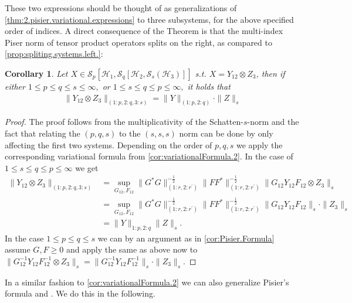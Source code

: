 \documentclass[11pt]{article}
\newcommand{\1}{\ensuremath{\mathbbm{1}}}
\theoremstyle{newdefinition}
\theoremstyle{newplain}
\newtheorem{corollary}[definition]{Corollary}
\theoremstyle{myplain}
\begin{document}
These two expressions should be thought of as generalizations of \cref{thm:2.pisier.variational.expressions} to three subsystems, for the above specified order of indices.
A direct consequence of the Theorem is that the multi-index Piser norm of tensor product operators splits on the right, as compared to \cref{prop:spliting.systems.left.}:
\begin{corollary}
Let $X\in\mathcal{S}_{p}[\mathcal{H}_1,\mathcal{S}_q[\mathcal{H}_2,\mathcal{S}_s(\mathcal{H}_3)]]$ s.t. $X=Y_{12}\otimes Z_3$, then if either $1\leq p\leq q\leq s\leq \infty,$ or $1\leq s\leq q\leq p\leq \infty,$ it holds that
\begin{align}
    \|Y_{12}\otimes Z_3\|_{(1:p,2:q,3:s)} = \|Y\|_{(1:p,2:q)}\cdot\|Z\|_s
\end{align}
\end{corollary}
\begin{proof}
The proof follows from the multiplicativity of the Schatten-$s$-norm and the fact that relating the $(p,q,s)$ to the $(s,s,s)$ norm can be done by only affecting the first two systems. 
Depending on the order of $p,q,s$ we apply the corresponding variational formula from \cref{cor:variationalFormula.2}. In the case of $1\leq s\leq q\leq p\leq \infty$ we get
\begin{align}
   \|Y_{12}\otimes Z_3\|_{(1:p,2:q,3:s)} &= \sup_{G_{12},F_{12}}\|G^*G\|^{-\frac{1}{2}}_{(1:r,2:r^\prime)}\|FF^*\|^{-\frac{1}{2}}_{(1:r,2:r^\prime)}\|G_{12}Y_{12}F_{12}\otimes Z_3\|_s \\&= \sup_{G_{12},F_{12}}\|G^*G\|^{-\frac{1}{2}}_{(1:r,2:r^\prime)}\|FF^*\|^{-\frac{1}{2}}_{(1:r,2:r^\prime)}\|G_{12}Y_{12}F_{12}\|_s \cdot\|Z_3\|_s \\ &= \|Y\|_{1:p,2:q}\|Z\|_s.
\end{align}
In the case $1\leq p\leq q\leq s$ we can by an argument as in \cref{cor:Pisier.Formula} assume $G,F\geq 0$ and apply the same as above now to $\|G_{12}^{-1}Y_{12}F^{-1}_{12}\otimes Z_3\|_s=\|G_{12}^{-1}Y_{12}F^{-1}_{12}\|_{s}\cdot\|Z_3\|_s$.
\end{proof}

In a similar fashion to \cref{cor:variationalFormula.2} we can also generalize Pisier's formula and \cite[Equation (3.3)]{Devetak.2006}. We do this in the following.
\end{document}
